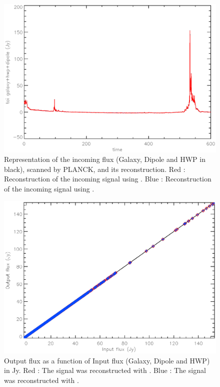 \begin{figure}[h]
\center
	\includegraphics[scale=0.5]{Figures/toi-galaxy-hwp-dipole-planck.eps}
	\caption{Representation of the incoming flux (Galaxy, Dipole and HWP in black), scanned by PLANCK, and its reconstruction. Red : Reconstruction of the incoming signal using \cf. Blue : Reconstruction of the incoming signal using \rf. }
	\label{fig:toi-galaxy-hwp-dipole-planck}
\end{figure}

\begin{figure}[h]
\center
	\includegraphics[scale=0.5]{Figures/NL-galaxy-hwp-dipole-planck.eps}
	\caption{Output flux as a function of Input flux (Galaxy, Dipole and HWP) in Jy. Red : The signal was reconstructed with \cf. Blue : The signal was reconstructed with \rf.}
	\label{fig:nl-galaxy-hwp-dipole-planck}
\end{figure}


